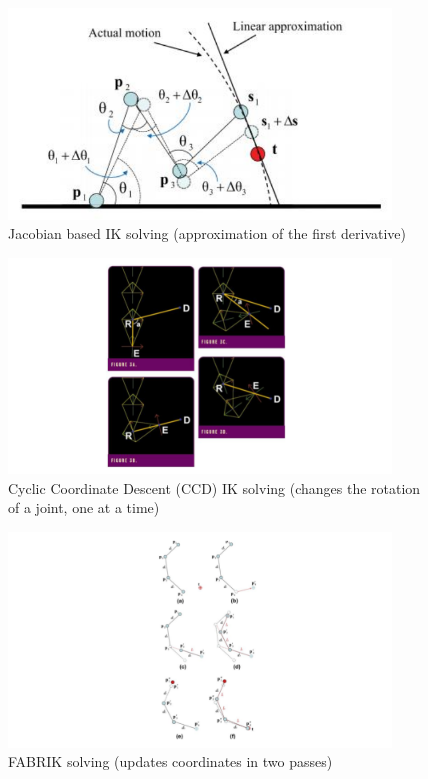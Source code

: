 \documentclass[../../main.tex]{subfiles}
\begin{document}
\begin{figure}
    \centering \includegraphics[width = 4in]{chapters/background_work/images/jacobian_based.png}
    \caption{Jacobian based IK solving (approximation of the first derivative)}
    \label{fig:jacobian_based}
\end{figure}

\begin{figure}
  \centering \includegraphics[width = 4in]{chapters/background_work/images/ccdik.png}
  \caption{Cyclic Coordinate Descent (CCD) IK solving (changes the rotation of a joint, one at a time)}
  \label{fig:ccdik}
\end{figure}

\begin{figure}
  \centering \includegraphics[width = 4in]{chapters/background_work/images/fabrik.png}
  \caption{FABRIK solving (updates coordinates in two passes)}
  \label{fig:fabrik}
\end{figure}
\end{document}
